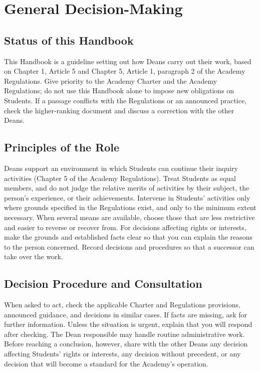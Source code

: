 \newpage
\chapter{General Decision-Making}

\section{Status of this Handbook}

This Handbook is a guideline setting out how Deans carry out their work, based on Chapter 1, Article 5 and Chapter 5, Article 1, paragraph 2 of the Academy Regulations.
Give priority to the Academy Charter and the Academy Regulations; do not use this Handbook alone to impose new obligations on Students.
If a passage conflicts with the Regulations or an announced practice, check the higher-ranking document and discuss a correction with the other Deans.

\section{Principles of the Role}

Deans support an environment in which Students can continue their inquiry activities (Chapter 5 of the Academy Regulations).
Treat Students as equal members, and do not judge the relative merits of activities by their subject, the person's experience, or their achievements.
Intervene in Students' activities only where grounds specified in the Regulations exist, and only to the minimum extent necessary. When several means are available, choose those that are less restrictive and easier to reverse or recover from.
For decisions affecting rights or interests, make the grounds and established facts clear so that you can explain the reasons to the person concerned.
Record decisions and procedures so that a successor can take over the work.

\section{Decision Procedure and Consultation}

When asked to act, check the applicable Charter and Regulations provisions, announced guidance, and decisions in similar cases.
If facts are missing, ask for further information. Unless the situation is urgent, explain that you will respond after checking.
The Dean responsible may handle routine administrative work. Before reaching a conclusion, however, share with the other Deans any decision affecting Students' rights or interests, any decision without precedent, or any decision that will become a standard for the Academy's operation.

